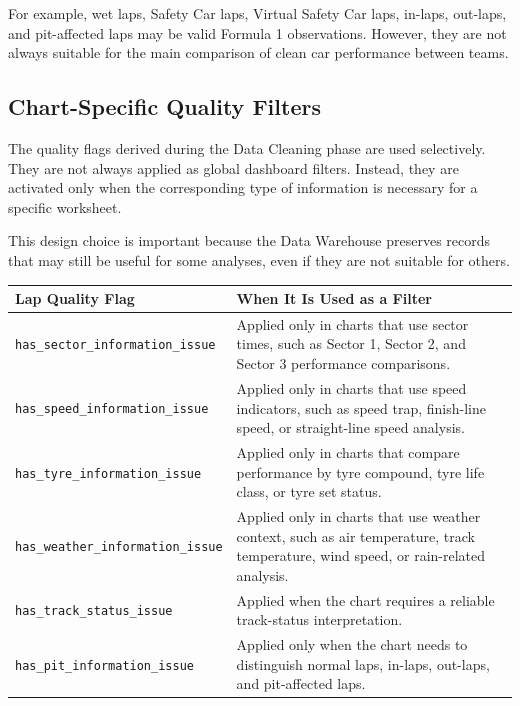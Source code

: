\documentclass[12pt,a4paper]{article}
\begin{document}
	For example, wet laps, Safety Car laps, Virtual Safety Car laps, in-laps, out-laps, and pit-affected laps may be valid Formula 1 observations.
	However, they are not always suitable for the main comparison of clean car performance between teams.
	
	\subsection{Chart-Specific Quality Filters}
	
	The quality flags derived during the Data Cleaning phase are used selectively.
	They are not always applied as global dashboard filters.
	Instead, they are activated only when the corresponding type of information is necessary for a specific worksheet.
	
	This design choice is important because the Data Warehouse preserves records that may still be useful for some analyses, even if they are not suitable for others.
	
	\begin{longtable}{p{6cm} p{8cm}}
		\toprule
		\textbf{Lap Quality Flag} & \textbf{When It Is Used as a Filter} \\
		\midrule
		
		\texttt{has\_sector\_information\_issue}
		& Applied only in charts that use sector times, such as Sector 1, Sector 2, and Sector 3 performance comparisons. \\
		
		\texttt{has\_speed\_information\_issue}
		& Applied only in charts that use speed indicators, such as speed trap, finish-line speed, or straight-line speed analysis. \\
		
		\texttt{has\_tyre\_information\_issue}
		& Applied only in charts that compare performance by tyre compound, tyre life class, or tyre set status. \\
		
		\texttt{has\_weather\_information\_issue}
		& Applied only in charts that use weather context, such as air temperature, track temperature, wind speed, or rain-related analysis. \\
		
		\texttt{has\_track\_status\_issue}
		& Applied when the chart requires a reliable track-status interpretation. \\
		
		\texttt{has\_pit\_information\_issue}
		& Applied only when the chart needs to distinguish normal laps, in-laps, out-laps, and pit-affected laps. \\
		
		\bottomrule
	\end{longtable}
	
\end{document}
